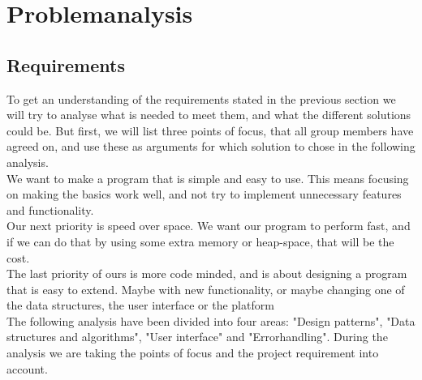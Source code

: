 \documentclass[a4paper,10pt,titlepage]{article}
\begin{document}
	\section{Problemanalysis}
		\subsection{Requirements}
To get an understanding of the requirements stated in the previous section we will try to analyse what is needed to meet them, and what the different solutions could be. But first, we will list three points of focus, that all group members have agreed on, and use these as arguments for which solution to chose in the following analysis.\\

We want to make a program that is simple and easy to use. This means focusing on making the basics work well, and not try to implement unnecessary features and functionality.\\

Our next priority is speed over space. We want our program to perform fast, and if we can do that by using some extra     memory or heap-space, that will be the cost.\\

The last priority of ours is more code minded, and is about designing a program that is easy to extend. Maybe with new functionality, or maybe changing one of the data structures, the user interface or the platform\\

The following analysis have been divided into four areas: "Design patterns", "Data structures and algorithms", "User interface" and "Errorhandling". During the analysis we are taking the points of focus and the project requirement into account.
\end{document}
